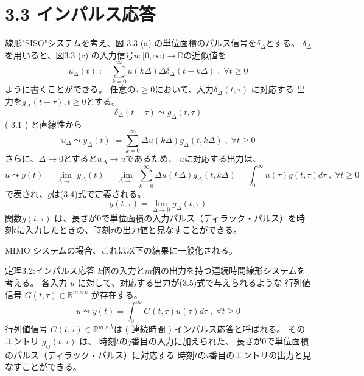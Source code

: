 \documentclass{jsarticle}
\begin{document}


\section*{3.3 インパルス応答}

線形"SISO"システムを考え、図 3.3 (a) の単位面積のパルス信号を$\delta_\Delta$とする。
$\delta_\Delta$を用いると、図3.3 (c) の入力信号$u : [ 0 , \infty)\rightarrow\mathbb{R}$の近似値を
\begin{equation}
  u_\Delta(t) := \sum^\infty_{k=0} u(k\Delta)\Delta\delta_\Delta(t-k\Delta)\;,\; \forall t\geq 0 \tag{3.1}
\end{equation}
ように書くことができる。
任意の$\tau\geq 0$において、入力$\delta_\Delta( t , \tau )$ に対応する
出力を$g_\Delta ( t - \tau ) , t\geq 0$とする。
\begin{equation*}
  \delta_\Delta(t-\tau) \leadsto  g_\Delta(t,\tau)
\end{equation*}
( 3.1 ) と直線性から 
\begin{equation}
  u_\Delta \leadsto y_\Delta(t) := \sum^\infty_{k=0} \Delta u(k\Delta)g_\Delta(t,k\Delta)\;,\;\forall t\geq 0 \tag{3.2}
\end{equation}
さらに、$\Delta \rightarrow 0$とすると$u_\Delta \rightarrow u$であるため、
$u$に対応する出力は、
\begin{equation}
  u \leadsto y(t) = \lim_{\Delta\rightarrow 0}{y_\Delta(t)}
  = \lim_{\Delta\rightarrow 0}{\sum^\infty_{k=0}}\Delta u(k\Delta)g_\Delta(t,k\Delta)
  = \int^\infty_0 u(\tau)g(t,\tau)d\tau\;,\;\forall t\geq 0 \tag{3.3}
\end{equation}
で表され、$g$は(3.4)式で定義される。
\begin{equation}
  g(t,\tau) = \lim_{\Delta\rightarrow 0}{g_\Delta(t,\tau)} \tag{3.4}
\end{equation}
関数$g ( t , \tau )$ は、長さが0で単位面積の入力パルス（ディラック・パルス）を時刻$t$に入力したときの、時刻$\tau$の出力値と見なすことができる。

MIMO システムの場合、これは以下の結果に一般化される。
\begin{itembox}[l]{定理3.2:インパルス応答}
  $k$個の入力と$m$個の出力を持つ連続時間線形システムを考える。
  各入力 $u$ に対して、対応する出力が(3.5)式で与えられるような
  行列値信号 $G ( t , \tau ) \in \mathbb{R}^{m\times k}$ が存在する。
  \begin{equation}
    u \leadsto y(t) =\int^\infty_0 G(t,\tau)u(\tau)d\tau\;,\;\forall t\geq 0 \tag{3.5}
  \end{equation}
  行列値信号 $G ( t , \tau ) \in \mathbb{R}^{m\times k}$は ( 連続時間 ) インパルス応答と呼ばれる。
  そのエントリ $g_{ij} ( t , \tau )$ は、
  時刻$t$の$j$番目の入力に加えられた、
  長さが0で単位面積のパルス（ディラック・パルス）に対応する
  時刻$t$の$i$番目のエントリの出力と見なすことができる。
\end{itembox}
\end{document}
